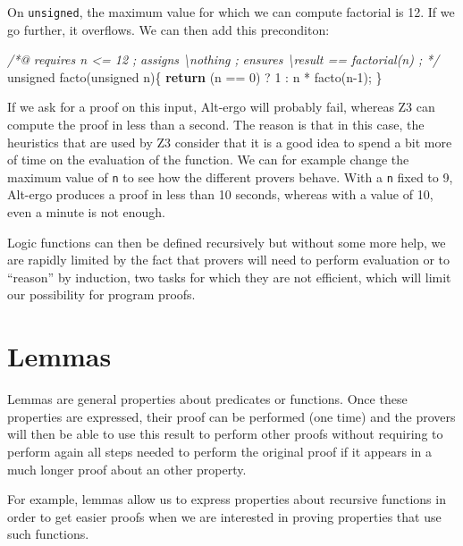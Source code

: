 \documentclass[12pt,francais,]{scrbook}
\newenvironment{Shaded}{}{}
\newcommand{\KeywordTok}[1]{\textcolor[rgb]{0.00,0.44,0.13}{\textbf{{#1}}}}
\newcommand{\DataTypeTok}[1]{\textcolor[rgb]{0.56,0.13,0.00}{{#1}}}
\newcommand{\DecValTok}[1]{\textcolor[rgb]{0.25,0.63,0.44}{{#1}}}
\newcommand{\CommentTok}[1]{\textcolor[rgb]{0.38,0.63,0.69}{\textit{{#1}}}}
\newcommand{\NormalTok}[1]{{#1}}
\begin{document}
On \texttt{unsigned}, the maximum value for which we can compute
factorial is 12. If we go further, it overflows. We can then add this
preconditon:

\begin{footnotesize}\begin{Shaded}
\begin{Highlighting}[]
\CommentTok{/*@ }
\CommentTok{  requires n <= 12 ;}
\CommentTok{  assigns \textbackslash{}nothing ;}
\CommentTok{  ensures \textbackslash{}result == factorial(n) ; }
\CommentTok{*/}
\DataTypeTok{unsigned} \NormalTok{facto(}\DataTypeTok{unsigned} \NormalTok{n)\{}
  \KeywordTok{return} \NormalTok{(n == }\DecValTok{0}\NormalTok{) ? }\DecValTok{1} \NormalTok{: n * facto(n}\DecValTok{-1}\NormalTok{);}
\NormalTok{\}}
\end{Highlighting}
\end{Shaded}\end{footnotesize}

If we ask for a proof on this input, Alt-ergo will probably fail,
whereas Z3 can compute the proof in less than a second. The reason is
that in this case, the heuristics that are used by Z3 consider that it
is a good idea to spend a bit more of time on the evaluation of the
function. We can for example change the maximum value of \texttt{n} to
see how the different provers behave. With a \texttt{n} fixed to 9,
Alt-ergo produces a proof in less than 10 seconds, whereas with a value
of 10, even a minute is not enough.

Logic functions can then be defined recursively but without some more
help, we are rapidly limited by the fact that provers will need to
perform evaluation or to ``reason'' by induction, two tasks for which
they are not efficient, which will limit our possibility for program
proofs.

\section{Lemmas}\label{lemmas}

Lemmas are general properties about predicates or functions. Once these
properties are expressed, their proof can be performed (one time) and
the provers will then be able to use this result to perform other proofs
without requiring to perform again all steps needed to perform the
original proof if it appears in a much longer proof about an other
property.

For example, lemmas allow us to express properties about recursive
functions in order to get easier proofs when we are interested in
proving properties that use such functions.
\end{document}
